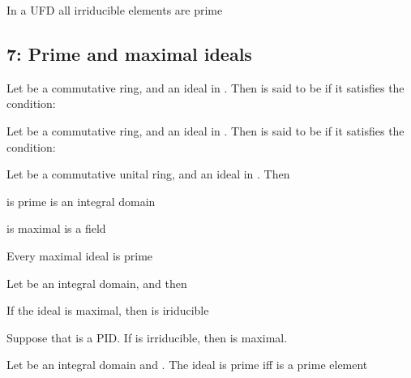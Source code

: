 \begin{Le}
\begin{Le} In a UFD all irriducible elements are prime \end{Le}


\subsection{7: Prime and maximal ideals}
\begin{D} Let  be a commutative ring, and  an ideal in . 
Then  is said to be  if it satisfies the condition: \end{D}

\begin{D} Let  be a commutative ring, and  an ideal in . 
Then  is said to be  if it satisfies the condition: 
\end{D}


\begin{T} Let  be a commutative unital ring, and  an ideal in . Then
\begin{compactitem}
\item {} is prime \e{$\Longleftrightarrow$}  is an integral domain
\item {} is maximal \e{$\Longleftrightarrow$}  is a field
\end{compactitem}
\end{T}

\begin{C} Every maximal ideal is prime \end{C}

\begin{Le} Let  be an integral domain, and  then 
\begin{compactitem}
\item If the ideal  is maximal, then  is iriducible
\item Suppose that  is a PID. If  is irriducible, then  is maximal.
\end{compactitem}
\end{Le}

\begin{Le}
Let  be an integral domain and . The ideal  is prime iff  is a prime element
\end{Le}


\end{Le}
